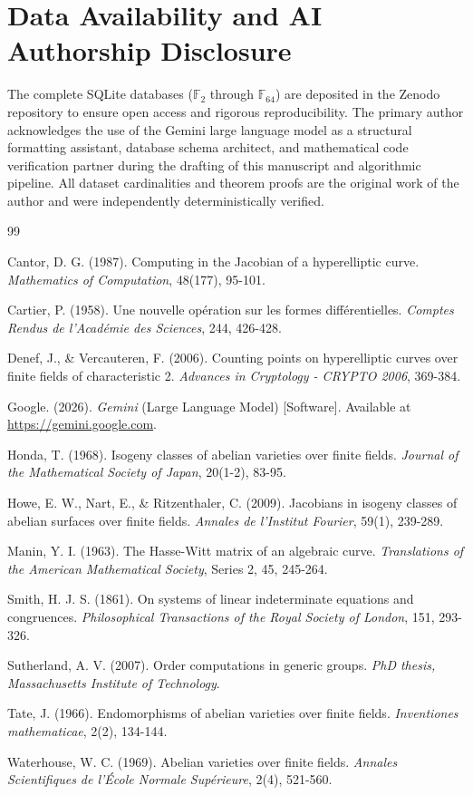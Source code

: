\documentclass[letterpaper, 11pt]{article}
\begin{document}
\section{Data Availability and AI Authorship Disclosure}
The complete SQLite databases ($\mathbb{F}_{2}$ through $\mathbb{F}_{64}$) are deposited in the Zenodo repository to ensure open access and rigorous reproducibility. The primary author acknowledges the use of the Gemini large language model \cite{Gemini2026} as a structural formatting assistant, database schema architect, and mathematical code verification partner during the drafting of this manuscript and algorithmic pipeline. All dataset cardinalities and theorem proofs are the original work of the author and were independently deterministically verified.

\begin{thebibliography}{99}

Cantor, D. G. (1987). Computing in the Jacobian of a hyperelliptic curve. \textit{Mathematics of Computation}, 48(177), 95-101.

Cartier, P. (1958). Une nouvelle op\'{e}ration sur les formes diff\'{e}rentielles. \textit{Comptes Rendus de l'Acad\'{e}mie des Sciences}, 244, 426-428.

Denef, J., \& Vercauteren, F. (2006). Counting points on hyperelliptic curves over finite fields of characteristic 2. \textit{Advances in Cryptology - CRYPTO 2006}, 369-384.

Google. (2026). \textit{Gemini} (Large Language Model) [Software]. Available at \url{https://gemini.google.com}.

Honda, T. (1968). Isogeny classes of abelian varieties over finite fields. \textit{Journal of the Mathematical Society of Japan}, 20(1-2), 83-95.

Howe, E. W., Nart, E., \& Ritzenthaler, C. (2009). Jacobians in isogeny classes of abelian surfaces over finite fields. \textit{Annales de l'Institut Fourier}, 59(1), 239-289.

Manin, Y. I. (1963). The Hasse-Witt matrix of an algebraic curve. \textit{Translations of the American Mathematical Society}, Series 2, 45, 245-264.

Smith, H. J. S. (1861). On systems of linear indeterminate equations and congruences. \textit{Philosophical Transactions of the Royal Society of London}, 151, 293-326.

Sutherland, A. V. (2007). Order computations in generic groups. \textit{PhD thesis, Massachusetts Institute of Technology}.

Tate, J. (1966). Endomorphisms of abelian varieties over finite fields. \textit{Inventiones mathematicae}, 2(2), 134-144.

Waterhouse, W. C. (1969). Abelian varieties over finite fields. \textit{Annales Scientifiques de l'\'{E}cole Normale Sup\'{e}rieure}, 2(4), 521-560.

\end{thebibliography}
\end{document}
